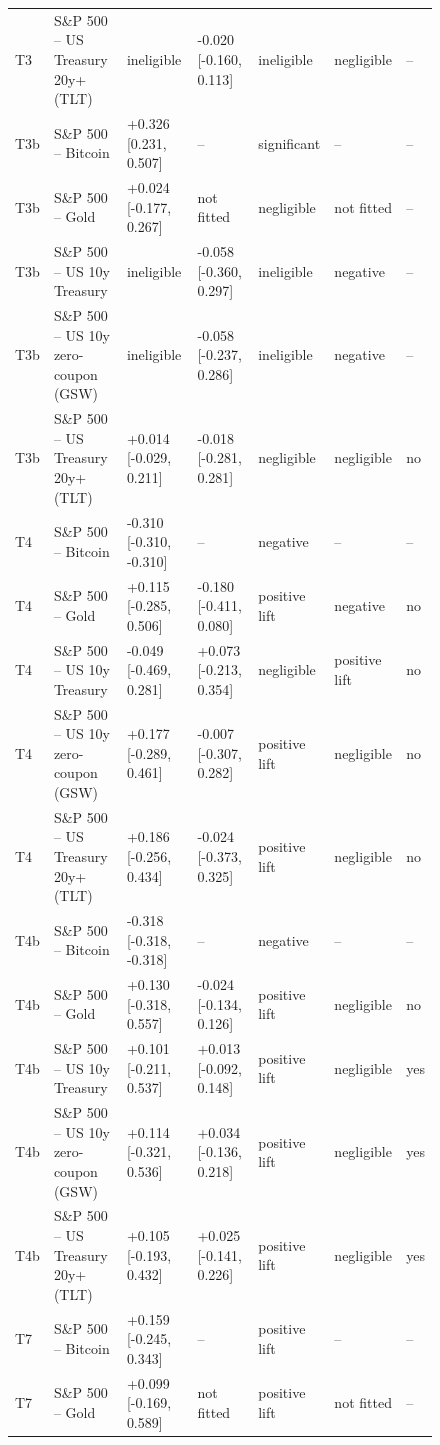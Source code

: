 \begin{figure}[t]
{\begin{tabular}{lllllll}
T3 & S\&P 500 -- US Treasury 20y+ (TLT) & ineligible & -0.020 [-0.160, 0.113] & ineligible & negligible & -- \\
T3b & S\&P 500 -- Bitcoin & +0.326 [0.231, 0.507] & -- & significant & -- & -- \\
T3b & S\&P 500 -- Gold & +0.024 [-0.177, 0.267] & not fitted & negligible & not fitted & -- \\
T3b & S\&P 500 -- US 10y Treasury & ineligible & -0.058 [-0.360, 0.297] & ineligible & negative & -- \\
T3b & S\&P 500 -- US 10y zero-coupon (GSW) & ineligible & -0.058 [-0.237, 0.286] & ineligible & negative & -- \\
T3b & S\&P 500 -- US Treasury 20y+ (TLT) & +0.014 [-0.029, 0.211] & -0.018 [-0.281, 0.281] & negligible & negligible & no \\
T4 & S\&P 500 -- Bitcoin & -0.310 [-0.310, -0.310] & -- & negative & -- & -- \\
T4 & S\&P 500 -- Gold & +0.115 [-0.285, 0.506] & -0.180 [-0.411, 0.080] & positive lift & negative & no \\
T4 & S\&P 500 -- US 10y Treasury & -0.049 [-0.469, 0.281] & +0.073 [-0.213, 0.354] & negligible & positive lift & no \\
T4 & S\&P 500 -- US 10y zero-coupon (GSW) & +0.177 [-0.289, 0.461] & -0.007 [-0.307, 0.282] & positive lift & negligible & no \\
T4 & S\&P 500 -- US Treasury 20y+ (TLT) & +0.186 [-0.256, 0.434] & -0.024 [-0.373, 0.325] & positive lift & negligible & no \\
T4b & S\&P 500 -- Bitcoin & -0.318 [-0.318, -0.318] & -- & negative & -- & -- \\
T4b & S\&P 500 -- Gold & +0.130 [-0.318, 0.557] & -0.024 [-0.134, 0.126] & positive lift & negligible & no \\
T4b & S\&P 500 -- US 10y Treasury & +0.101 [-0.211, 0.537] & +0.013 [-0.092, 0.148] & positive lift & negligible & yes \\
T4b & S\&P 500 -- US 10y zero-coupon (GSW) & +0.114 [-0.321, 0.536] & +0.034 [-0.136, 0.218] & positive lift & negligible & yes \\
T4b & S\&P 500 -- US Treasury 20y+ (TLT) & +0.105 [-0.193, 0.432] & +0.025 [-0.141, 0.226] & positive lift & negligible & yes \\
T7 & S\&P 500 -- Bitcoin & +0.159 [-0.245, 0.343] & -- & positive lift & -- & -- \\
T7 & S\&P 500 -- Gold & +0.099 [-0.169, 0.589] & not fitted & positive lift & not fitted & -- \\

\end{tabular}}
\end{figure}
